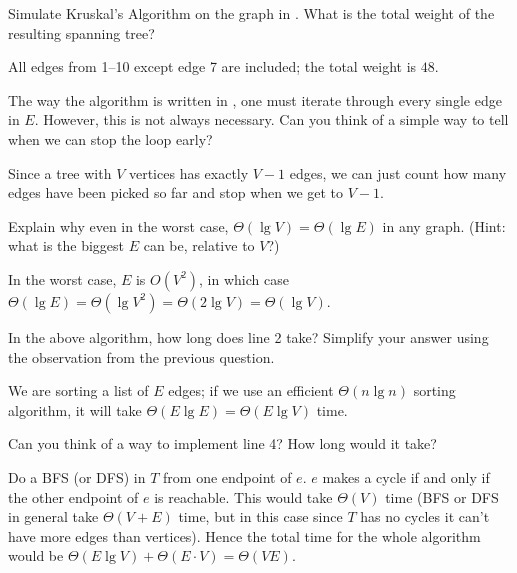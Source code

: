 \documentclass{tufte-handout}
\begin{document}
\begin{questions}
\item Simulate Kruskal's Algorithm on the graph in
  .  What is the total weight of the resulting
  spanning tree?

  \begin{answer}
  All edges from 1--10 except edge 7 are included; the total
  weight is $48$.
  \end{answer}
\item The way the algorithm is written in , one
  must iterate through every single edge in $E$.  However, this is not
  always necessary.  Can you think of a simple way to tell when we can
  stop the loop early?

  \begin{answer}
    Since a tree with $V$ vertices has exactly $V-1$ edges, we can
    just count how many edges have been picked so far and stop when we
    get to $V-1$.
  \end{answer}
\item Explain why even in the worst case,
  $\Theta(\lg V) = \Theta(\lg E)$ in any graph. (Hint: what is the
  biggest $E$ can be, relative to $V$?)

  \begin{answer}
    In the worst case, $E$ is $O(V^2)$, in which case $\Theta(\lg
    E) = \Theta(\lg V^2) = \Theta(2 \lg V) = \Theta(\lg V)$.
  \end{answer}
\item In the above algorithm, how long does line 2 take?  Simplify
  your answer using the observation from the previous question.

  \begin{answer}
    We are sorting a list of $E$ edges; if we use an efficient
    $\Theta(n \lg n)$ sorting algorithm, it will take $\Theta(E \lg E)
    = \Theta(E \lg V)$ time.
  \end{answer}
\item Can you think of a way to implement line 4?  How long would it
  take?

  \begin{answer}
    Do a BFS (or DFS) in $T$ from one endpoint of $e$.  $e$
    makes a cycle if and only if the other endpoint of $e$ is
    reachable.  This would take $\Theta(V)$ time (BFS or DFS in
    general take $\Theta(V+E)$ time, but in this case since $T$ has no
    cycles it can't have more edges than vertices).  Hence the total
    time for the whole algorithm would be $\Theta(E \lg V) + \Theta(E
    \cdot V) = \Theta(VE)$.
  \end{answer}
\end{questions}
\end{document}

